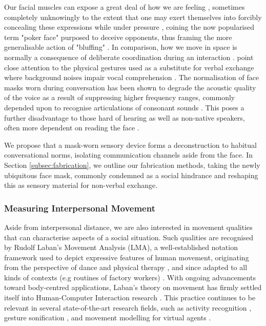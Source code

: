 Our facial muscles can expose a great deal of how we are feeling \citep{qian_effects_2018,todorov_face_2017}, sometimes completely unknowingly to the extent that one may exert themselves into forcibly concealing these expressions while under pressure \citep{billings_challenge_2002}, coining the now popularised term "poker face" purposed to deceive opponents, thus framing the more generalisable action of "bluffing" \citep{billings_challenge_2002}. In comparison, how we move in space is normally a consequence of deliberate coordination during an interaction \citep{poyatos_interactive_1980,jones_communication_2016}. \citeauthor{hadley_synchrony_2021} point close attention to the physical gestures used as a substitute for verbal exchange where background noises impair vocal comprehension \cite{hadley_synchrony_2021}. The normalisation of face masks worn during conversation has been shown to degrade the acoustic quality of the voice as a result of suppressing higher frequency ranges, commonly depended upon to recognise articulations of consonant sounds \citep{saunders_impacts_2021,rahne_influence_2021,nobrega_how_2020}. This poses a further disadvantage to those hard of hearing \citep{mckee_overcoming_2020} as well as non-native speakers, often more dependent on reading the face \citep{inceoglu_language_2021,jabber_non-verbal_2020}.

We propose that a mask-worn sensory device forms a deconstruction to habitual conversational norms, isolating communication channels aside from the face. In Section \ref{subsec:fabrication}, we outline our fabrication methods, taking the newly ubiquitous face mask, commonly condemned as a social hindrance and reshaping this as sensory material for non-verbal exchange.

\subsubsection{Measuring Interpersonal Movement}
\label{sec2_measuring}

Aside from interpersonal distance, we are also interested in movement qualities that can characterise aspects of a social situation. Such qualities are recognised by Rudolf Laban’s Movement Analysis (LMA), a well-established notation framework used to depict expressive features of human movement, originating from the perspective of dance and physical therapy \citep{laban_mastery_1988}, and since adapted to all kinds of contexts (e.g routines of factory workers) \citep{davies_beyond_2006}. With ongoing advancements toward body-centred applications, Laban's theory on movement has firmly settled itself into Human-Computer Interaction research \citep{ziegelmaier_laban_2020}. This practice continues to be relevant in several state-of-the-art research fields, such as activity recognition \citep{ajili_robust_2017,truong_laban_2017}, gesture sonification \citep{fdili_alaoui_seeing_2017}, and movement modelling for virtual agents \citep{durupinar_perform_2017, ajili_robust_2017}.


